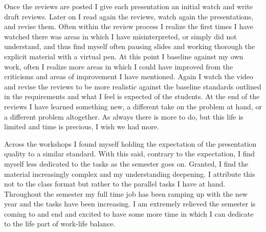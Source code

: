 \documentclass[12pt]{article}
\begin{document}
Once the reviews are posted I give each presentation an initial watch and write draft reviews. Later on I read again the reviews, watch again the presentations, and revise them. Often within the review process I realize the first times I have watched there was areas in which I have misinterpreted, or simply did not understand, and thus find myself often pausing slides and working thorough the explicit material with a virtual pen. At this point I baseline against my own work, often I realize more areas in which I could have improved from the criticisms and areas of improvement I have mentioned. Again I watch the video and revise the reviews to be more realistic against the baseline standards outlined in the requirements and what I feel is expected of the students. At the end of the reviews I have learned something new, a different take on the problem at hand, or a different problem altogether. As always there is more to do, but this life is limited and time is precious, I wish we had more. 

Across the workshops I found myself holding the expectation of the presentation quality to a similar standard. With this said, contrary to the expectation, I find myself less dedicated to the tasks as the semester goes on. Granted, I find the material increasingly complex and my understanding deepening. I attribute this not to the class format but rather to the parallel tasks I have at hand. Throughout the semester my full time job has been ramping up with the new year and the tasks have been increasing. I am extremely relieved the semester is coming to and end and excited to have some more time in which I can dedicate to the life part of work-life balance.  
\end{document}
